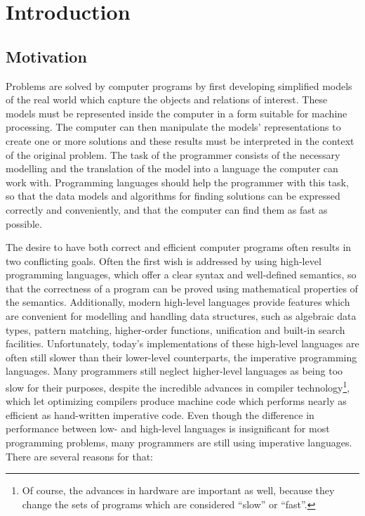 
\chapter{Introduction}
\label{cha:introduction}

\section{Motivation}
\label{sec:motivation}

Problems are solved by computer programs by first developing
simplified models of the real world which capture the objects and
relations of interest.  These models must be represented inside the
computer in a form suitable for machine processing.  The computer can
then manipulate the models' representations to create one or more
solutions and these results must be interpreted in the context of the
original problem.  The task of the programmer consists of the
necessary modelling and the translation of the model into a language
the computer can work with.  Programming languages should help the
programmer with this task, so that the data models and algorithms for
finding solutions can be expressed correctly and conveniently, and
that the computer can find them as fast as possible.

The desire to have both correct and efficient computer programs often
results in two conflicting goals.  Often the first wish is addressed
by using high-level programming languages, which offer a clear syntax
and well-defined semantics, so that the correctness of a program can
be proved using mathematical properties of the semantics.
Additionally, modern high-level languages provide features which are
convenient for modelling and handling data structures, such as
algebraic data types, pattern
matching, higher-order
functions, unification
and built-in search facilities.
Unfortunately, today's implementations of these high-level languages
are often still slower than their lower-level counterparts, the
imperative programming languages.  Many programmers still neglect
higher-level languages as being too slow for their purposes, despite
the incredible advances in compiler technology\footnote{Of course, the
  advances in hardware are important as well, because they change the
  sets of programs which are considered ``slow'' or ``fast''.}, which
let optimizing compilers produce machine code which performs nearly as
efficient as hand-written imperative code. Even though the difference
in performance between low- and high-level languages is insignificant
for most programming problems, many programmers are still using
imperative languages.  There are several reasons for that:

